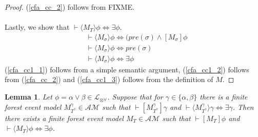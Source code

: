 \documentclass[12pt, a4paper, titlepage]{scrartcl}
\newtheorem{lemma}{Lemma}[section]
\numberwithin{equation}{section}
\newcommand{\sqex}[1]{[{#1}]}
\newcommand{\anex}[1]{\langle {#1} \rangle}
\newcommand{\lang}{\mathcal{L}}
\newcommand{\langArbAct}{\lang_{\otimes\forall}}
\begin{document}
\begin{proof}
(\ref{cfa_cc_2}) follows from FIXME.\\
\\
Lastly, we show that $\vdash \anex{ M_T } \phi \iff \exists \phi$.
\begin{align}
	& \vdash \anex{ M_\sigma } \phi \iff (pre(\sigma) \land [ M_\sigma ] \phi \label{cfa_cc1_1}\\
	& \vdash \anex{ M_\sigma } \phi \iff pre(\sigma) \label{cfa_cc1_2}\\
	& \vdash \anex{ M_\sigma } \phi \iff \exists \phi\label{cfa_cc1_3}
\end{align}
(\ref{cfa_cc1_1}) follows from a simple semantic argument, (\ref{cfa_cc1_2}) follows from
(\ref{cfa_cc_2}) and (\ref{cfa_cc1_3}) follows from the definition of $M$.
\end{proof}

\begin{lemma} \label{disjunctionFormulaAchievementK}
Let $\phi = \alpha \lor \beta \in \langArbAct$.
Suppose that for $\gamma \in \{\alpha, \beta\}$ there is a finite forest event model
$M^\gamma_{T^\gamma} \in \mathcal{AM}$ such that
$\vdash \sqex{M^\gamma_{T^\gamma}} \gamma$
and $\vdash \anex{ M^\gamma_{T^\gamma} } \gamma \iff \exists \gamma$.
Then there exists a finite forest event model $M_T \in \mathcal{AM}$ such that $\vdash \sqex{M_T}\phi$ and
$\vdash \anex{ M_T } \phi \iff \exists \phi$.
\end{lemma}
\end{document}
